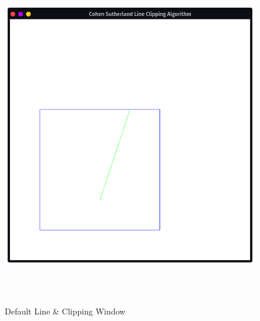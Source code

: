 \documentclass[12pt, a4]{article}
\begin{document}
\subsection*{}
\begin{figure}[h]
\centering
\caption{Default Line \& Clipping Window}
\includegraphics[height=15cm, width=15cm]{Outputs/Output-1.png}
\end{figure}

\newpage
\end{document}
